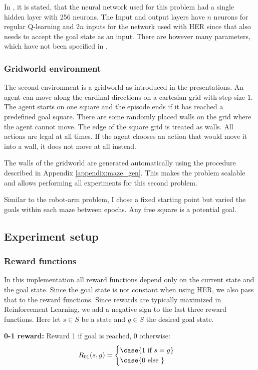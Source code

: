 In \parencite[Appendix A]{HERPaper}, it is stated, that the neural network used for this problem had a single hidden layer with 256 neurons. The Input and output layers have $n$ neurons for regular Q-learning and $2n$ inputs for the network used with HER since that also needs to accept the goal state as an input.
There are however many parameters, which have not been specified in \parencite{HERPaper}.
%
\subsubsection{Gridworld environment}
The second environment is a gridworld as introduced in the presentations. An agent can move along the cardinal directions on a cartesian grid with step size $1$. The agent starts on one square and the episode ends if it has reached a predefined goal square. There are some randomly placed walls on the grid where the agent cannot move. The edge of the square grid is treated as walls.
All actions are legal at all times. If the agent chooses an action that would move it into a wall, it does not move at all instead.

The walls of the gridworld are generated automatically using the procedure described in Appendix \ref{appendix:maze_gen}. This makes the problem scalable and allows performing all experiments for this second problem.

Similar to the robot-arm problem, I chose a fixed starting point but varied the goals within each maze between epochs. Any free square is a potential goal.
%
\subsection{Experiment setup}
\subsubsection{Reward functions}
In this implementation all reward functions depend only on the current state and the goal state. Since the goal state is not constant when using HER, we also pass that to the reward functions. Since rewards are typically maximized in Reinforcement Learning, we add a negative sign to the last three reward functions.
Here let $s \in S$ be a state and $g \in S$ the desired goal state.

\textbf{0-1 reward:}
Reward 1 if goal is reached, 0 otherwise:
$$
R_{01}(s, g) = \begin{cases}
\case {1 \text{ if } s=g} \\
\case {0 \text{ else }}
\end{cases}
$$

